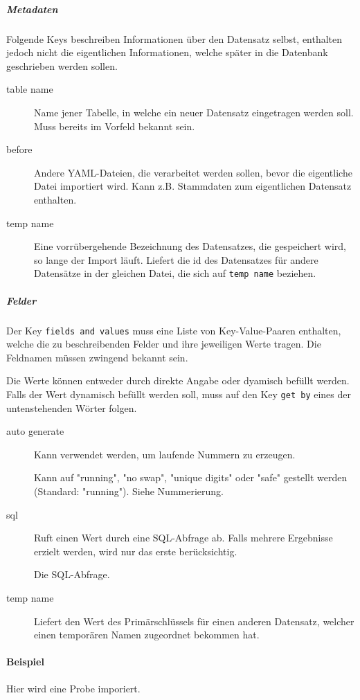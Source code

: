 \par

\subparagraph{Metadaten}
Folgende Keys beschreiben Informationen über den Datensatz selbst, enthalten jedoch nicht die eigentlichen Informationen, welche später in die Datenbank geschrieben werden sollen.

\begin{description}
\item[table name] Name jener Tabelle, in welche ein neuer Datensatz eingetragen werden soll.
Muss bereits im Vorfeld bekannt sein.
\item[before] Andere YAML-Dateien, die verarbeitet werden sollen, bevor die eigentliche Datei importiert wird.
Kann z.B. Stammdaten zum eigentlichen Datensatz enthalten.
\item[temp name] Eine vorrübergehende Bezeichnung des Datensatzes, die gespeichert wird, so lange der Import läuft.
Liefert die id des Datensatzes für andere Datensätze in der gleichen Datei, die sich auf \texttt{temp name} beziehen.
\end{description}

\subparagraph{Felder}
Der Key \texttt{fields and values} muss eine Liste von Key-Value-Paaren enthalten, welche die zu beschreibenden Felder und ihre jeweiligen Werte tragen.
Die Feldnamen müssen zwingend bekannt sein.

\par

Die Werte können entweder durch direkte Angabe oder dyamisch befüllt werden. Falls der Wert dynamisch befüllt werden soll, muss auf den Key \texttt{get by} eines der untenstehenden Wörter folgen.

\begin{description}
\item[auto generate] Kann verwendet werden, um laufende Nummern zu erzeugen.

 Kann auf "running", "no swap", "unique digits" oder "safe" gestellt werden (Standard: "running"). Siehe Nummerierung.

\item[sql] Ruft einen Wert durch eine SQL-Abfrage ab.
Falls mehrere Ergebnisse erzielt werden, wird nur das erste berücksichtig.

 Die SQL-Abfrage.

\item[temp name] Liefert den Wert des Primärschlüssels für einen anderen Datensatz, welcher einen temporären Namen zugeordnet bekommen hat.
\end{description}

\paragraph{Beispiel}

Hier wird eine Probe imporiert.


